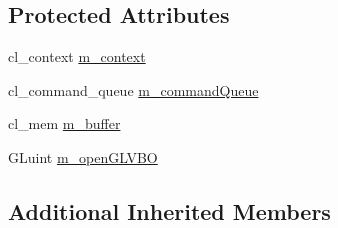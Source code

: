 \subsection*{Protected Attributes}
\begin{DoxyCompactItemize}
\item 
cl\+\_\+context \hyperlink{classbt_open_g_l_interop_vertex_buffer_descriptor_a3c6c5547bbb9d993717db1414f74ab38}{m\+\_\+context}
\item 
cl\+\_\+command\+\_\+queue \hyperlink{classbt_open_g_l_interop_vertex_buffer_descriptor_a710e2e4eb234a107dc10e32528b54cd7}{m\+\_\+command\+Queue}
\item 
cl\+\_\+mem \hyperlink{classbt_open_g_l_interop_vertex_buffer_descriptor_a2a0be0a9f9fa154dcf25b7cd4044b5cb}{m\+\_\+buffer}
\item 
G\+Luint \hyperlink{classbt_open_g_l_interop_vertex_buffer_descriptor_aceb2909c30dc9fb57520211254e5d8e8}{m\+\_\+open\+G\+L\+V\+B\+O}
\end{DoxyCompactItemize}
\subsection*{Additional Inherited Members}


